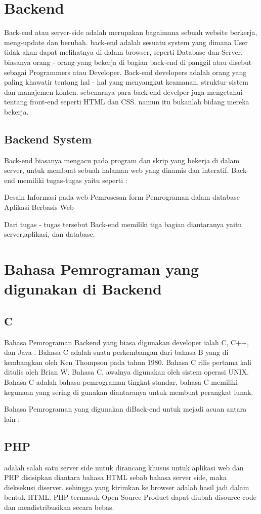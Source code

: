 \section{Backend}
Back-end atau server-side adalah merupakan bagaimana sebuah website berkerja, meng-update
dan berubah. back-end adalah sesuatu system yang dimana User tidak akan dapat melihatnya di dalam browser,
seperti Database dan Server. biasanya orang - orang yang bekerja di bagian back-end di panggil atau disebut sebagai
Programmers atau Developer. Back-end developers adalah orang yang paling khawatir tentang hal - hal yang menyangkut keamanan,
struktur sistem dan manajemen konten. sebenarnya para back-end develper juga mengetahui tentang front-end seperti HTML dan CSS.
namun itu bukanlah bidang mereka bekerja. 

\subsection{Backend System}
Back-end biasanya mengacu pada program dan skrip yang bekerja di dalam server, untuk membuat sebuah halaman web yang dinamis dan interatif. Back-end memiliki tugas-tugas yaitu seperti :

Desain Informasi pada web
Pemrosesan form
Pemrograman dalam database
Aplikasi Berbasis Web

Dari tugas - tugas tersebut Back-end memiliki tiga bagian diantaranya yaitu server,aplikasi, dan database.

\section{Bahasa Pemrograman yang digunakan di Backend}

\subsection{C}
Bahasa Pemrograman Backend yang biasa digunakan developer ialah C, C++, dan Java .
Bahasa C adalah suatu perkembangan dari bahasa B yang di kembangkan oleh Ken Thompson pada tahun 1980.
Bahasa C rilis pertama kali ditulis oleh Brian W. Bahasa C, awalnya digunakan oleh sistem operasi UNIX.
Bahasa C adalah bahasa pemrograman tingkat standar, bahasa C memiliki kegunaan yang sering di gunakan
diantaranya untuk membuat perangkat lunak.

Bahasa Pemrograman yang digunakan diBack-end untuk mejadi acuan antara lain :
\subsection {PHP}
 	adalah salah satu server side untuk dirancang khusus untuk aplikasi web dan PHP disisipkan diantara bahasa HTML sebab bahasa server side, maka dieksekusi diserver. sehingga yang kirimkan ke browser adalah hasil jadi dalam bentuk HTML. PHP termasuk Open Source Product dapat diubah disource code dan mendistribusikan secara bebas.

